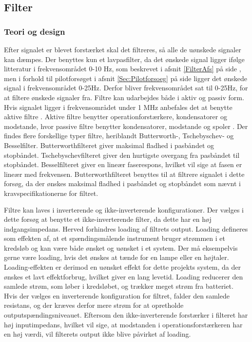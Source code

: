 \subsection{Filter}
\subsubsection{Teori og design}
Efter signalet er blevet forstærket skal det filtreres, så alle de uønskede signaler kan dæmpes. Der benyttes kun et lavpasfilter, da det ønskede signal ligger ifølge litteratur i frekvensområdet 0-10 Hz, som beskrevet i afsnit \ref{FilterAfs} på side \pageref{FilterAfs}, men i forhold til pilotforsøget i afsnit \ref{Sec:Pilotforsoeg} på side \pageref{Sec:Pilotforsoeg} ligger det ønskede signal i frekvensområdet 0-25Hz. Derfor bliver frekvensområdet sat til 0-25Hz, for at filtere ønskede signaler fra. Filtre kan udarbejdes både i aktiv og passiv form. Hvis signalet ligger i frekvensområdet under 1 MHz anbefales det at benytte aktive filtre \cite{Carter2013}. Aktive filtre benytter operationforstærkere, kondensatorer og modstande, hvor passive filtre benytter kondensatorer, modstande og spoler \cite{Carter2013}. Der findes flere forskellige typer filtre, heriblandt Butterworth-, Tschebyschev- og Besselfilter. Butterworthfilteret giver maksimal fladhed i pasbåndet og stopbåndet. Tschebyschevfilteret giver den hurtigste overgang fra pasbåndet til stopbåndet. Besselfilteret giver en lineær faserespons, hvilket vil sige at fasen er lineær med frekvensen. \cite{Carter2013} Butterworthfilteret benyttes til at filtrere signalet i dette forsøg, da der ønskes maksimal fladhed i pasbåndet og stopbåndet som nævnt i kravspecifikationerne for filtret.

Filtre kan laves i inverterende og ikke-inverterende konfigurationer. Der vælges i dette forsøg at benytte et ikke-inverterende filter, da dette har en høj indgangsimpedans. Herved forhindres loading af filtrets output. Loading defineres som effekten af, at et spændingsmålende instrument bruger strømmen i et kredsløb og kan være både ønsket og uønsket i et system. Der må eksempelvis gerne være loading, hvis det ønskes at tænde for en lampe eller en højtaler. Loading-effekten er derimod en uønsket effekt for dette projekts system, da der ønskes et lavt effektforbrug, hvilket giver en lang levetid. Loading reducerer den samlede strøm, som løber i kredsløbet, og trækker meget strøm fra batteriet. \\
Hvis der vælges en inverterende konfiguration for filtret, falder den samlede resistans, og der kræves derfor mere strøm for at opretholde outputspændingsniveauet. Eftersom den ikke-inverterende forstærker i filteret har høj inputimpedans, hvilket vil sige, at modstanden i operationsforstærkeren har en høj værdi, vil filterets output ikke blive påvirket af loading. \cite{Webster2009,Carter2013,Karni2014}

